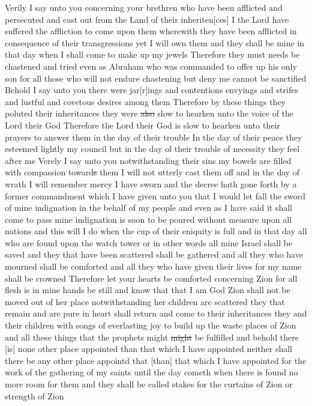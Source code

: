 				Verily I say unto you concerning your brethren who have been afflicted and persecuted and cast out from the Land of their inheriten[ces] I the Lord have suffered the affliction to come upon them wherewith they have been afflicted in consequence of their transgressions yet I will own them and they shall be mine in that day when I shall come to make up my jewels Therefore they must needs be chastened and tried even as Abraham who was commanded to offer up his only son for all those who will not endure chastening but deny me cannot be sanctified Behold I say unto you there were jar[r]ings and contentions envyings and strifes and lustful and covetous desires among them Therefore by these things they poluted their inheritances they were \sout{also} slow to hearken unto the voice of the Lord their God Therefore the Lord their God is slow to hearken unto their prayers to answer them in the day of their trouble In the day of their peace they esteemed lightly my council but in the day of their trouble of necessity they feel after me Verely I say unto you notwithstanding their sins my bowels are filled with compassion toward\sout{s} them I will not utterly cast them off and in the day of wrath I will remember mercy I have sworn and the decree hath gone forth by a former commandment which I have given unto you that I would let fall the sword of mine indignation in the behalf of my people and even as I have said it shall come to pass mine indignation is soon to be poured without measure upon all nations and this will I do when the cup of their eniquity is full and in that day all who are found upon the watch tower or in other words all mine Israel shall be saved and they that have been scattered shall be gathered and all they who have mourned shall be comforted and all they who have given their lives for my name shall be crowned Therefore let your hearts be comforted concerning Zion for all flesh is in mine hands be still and know that that I am God Zion shall not be moved out of her place notwithstanding her children are scattered they that remain and are pure in heart shall return and come to their inheritances they and their children with songs of everlasting joy to build up the waste places of Zion and all these things that the prophets might \sout{might} be fulfilled and behold there [is] none other place appointed than that which I have appointed neither shall there be any other place appointd that [than] that which I have appointed for the work of the gathering of my saints until the day cometh when there is found no more room for them and they shall be called stakes for the curtains of Zion or strength of Zion
				
